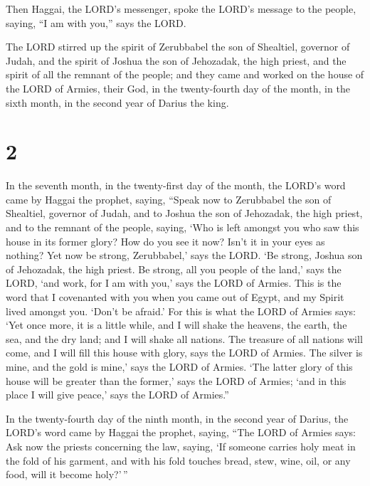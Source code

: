 Then Haggai, the LORD's messenger, spoke the LORD's
message to the people, saying, ``I am with you,'' says the LORD.

 The LORD stirred up the spirit of Zerubbabel the son of
Shealtiel, governor of Judah, and the spirit of Joshua the son of
Jehozadak, the high priest, and the spirit of all the remnant of the
people; and they came and worked on the house of the LORD of Armies,
their God,  in the twenty-fourth day of the month, in the
sixth month, in the second year of Darius the king.

\hypertarget{section-1}{%
\section{2}\label{section-1}}

 In the seventh month, in the twenty-first day of the
month, the LORD's word came by Haggai the prophet, saying,
 ``Speak now to Zerubbabel the son of Shealtiel, governor
of Judah, and to Joshua the son of Jehozadak, the high priest, and to
the remnant of the people, saying,  `Who is left amongst
you who saw this house in its former glory? How do you see it now? Isn't
it in your eyes as nothing?  Yet now be strong,
Zerubbabel,' says the LORD. `Be strong, Joshua son of Jehozadak, the
high priest. Be strong, all you people of the land,' says the LORD, `and
work, for I am with you,' says the LORD of Armies.  This
is the word that I covenanted with you when you came out of Egypt, and
my Spirit lived amongst you. `Don't be afraid.'  For this
is what the LORD of Armies says: `Yet once more, it is a little while,
and I will shake the heavens, the earth, the sea, and the dry land;
 and I will shake all nations. The treasure of all nations
will come, and I will fill this house with glory, says the LORD of
Armies.  The silver is mine, and the gold is mine,' says
the LORD of Armies.  `The latter glory of this house will
be greater than the former,' says the LORD of Armies; `and in this place
I will give peace,' says the LORD of Armies.''

 In the twenty-fourth day of the ninth month, in the
second year of Darius, the LORD's word came by Haggai the prophet,
saying,  ``The LORD of Armies says: Ask now the priests
concerning the law, saying,  `If someone carries holy
meat in the fold of his garment, and with his fold touches bread, stew,
wine, oil, or any food, will it become holy?'\,''

